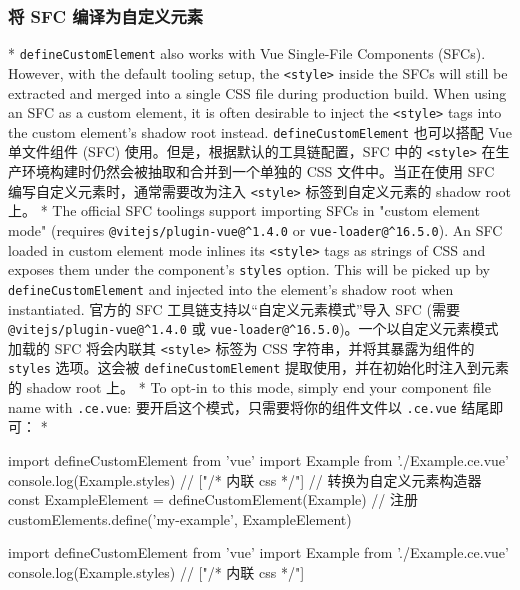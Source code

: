 \begin{paracol}{2}
\subsubsection{将 SFC 编译为自定义元素}
\switchcolumn[0]*%
\texttt{defineCustomElement} also works with Vue Single-File Components
(SFCs). However, with the default tooling setup, the
\texttt{\textless{}style\textgreater{}} inside the SFCs will still be
extracted and merged into a single CSS file during production build.
When using an SFC as a custom element, it is often desirable to inject
the \texttt{\textless{}style\textgreater{}} tags into the custom
element's shadow root instead.
\switchcolumn
\texttt{defineCustomElement} 也可以搭配 Vue 单文件组件 (SFC)
使用。但是，根据默认的工具链配置，SFC 中的
\texttt{\textless{}style\textgreater{}}
在生产环境构建时仍然会被抽取和合并到一个单独的 CSS 文件中。当正在使用
SFC 编写自定义元素时，通常需要改为注入
\texttt{\textless{}style\textgreater{}} 标签到自定义元素的 shadow root
上。
\switchcolumn[0]*%
The official SFC toolings support importing SFCs in "custom element
mode" (requires \texttt{@vitejs/plugin-vue@\^{}1.4.0} or
\texttt{vue-loader@\^{}16.5.0}). An SFC loaded in custom element mode
inlines its \texttt{\textless{}style\textgreater{}} tags as strings of
CSS and exposes them under the component's \texttt{styles} option. This
will be picked up by \texttt{defineCustomElement} and injected into the
element's shadow root when instantiated.
\switchcolumn
官方的 SFC 工具链支持以``自定义元素模式''导入 SFC (需要
\texttt{@vitejs/plugin-vue@\^{}1.4.0} 或
\texttt{vue-loader@\^{}16.5.0})。一个以自定义元素模式加载的 SFC
将会内联其 \texttt{\textless{}style\textgreater{}} 标签为 CSS
字符串，并将其暴露为组件的 \texttt{styles} 选项。这会被
\texttt{defineCustomElement} 提取使用，并在初始化时注入到元素的 shadow
root 上。
\switchcolumn[0]*%
To opt-in to this mode, simply end your component file name with
\texttt{.ce.vue}:
\switchcolumn
要开启这个模式，只需要将你的组件文件以 \texttt{.ce.vue} 结尾即可：
\switchcolumn[0]*%
\begin{codeJs}
import { defineCustomElement } from 'vue'
import Example from './Example.ce.vue'
console.log(Example.styles) // ["/* 内联 css */"]
// 转换为自定义元素构造器
const ExampleElement = defineCustomElement(Example)
// 注册
customElements.define('my-example', ExampleElement)
\end{codeJs}
\switchcolumn
\begin{codeJs}
import { defineCustomElement } from 'vue'
import Example from './Example.ce.vue'
console.log(Example.styles) // ["/* 内联 css */"]

\end{codeJs}
\end{paracol}
